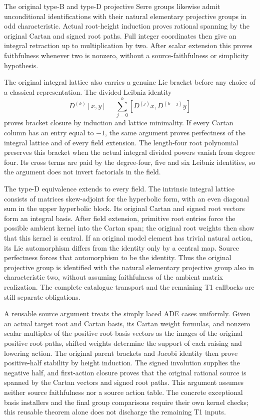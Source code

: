 The original type-B and type-D projective Serre groups likewise admit
unconditional identifications with their natural elementary projective
groups in odd characteristic. Actual root-height induction proves
rational spanning by the original Cartan and signed root paths. Full
integer coordinates then give an integral retraction up to multiplication
by two. After scalar extension this proves faithfulness whenever two is
nonzero, without a source-faithfulness or simplicity hypothesis.

The original integral lattice also carries a genuine Lie bracket before
any choice of a classical representation. The divided Leibniz identity
\[
 D^{(k)}[x,y]=\sum_{j=0}^{k}[D^{(j)}x,D^{(k-j)}y]
\]
proves bracket closure by induction and lattice minimality. If every
Cartan column has an entry equal to $-1$, the same argument proves
perfectness of the integral lattice and of every field extension.
The length-four root polynomial preserves this bracket when the actual
integral divided powers vanish from degree four. Its cross terms are
paid by the degree-four, five and six Leibniz identities, so the argument
does not invert factorials in the field.

The type-D equivalence extends to every field. The intrinsic integral
lattice consists of matrices skew-adjoint for the hyperbolic form, with an
even diagonal sum in the upper hyperbolic block. Its original Cartan and signed root vectors form an integral
basis. After field extension, primitive root entries force the possible
ambient kernel into the Cartan span; the original root weights then show
that this kernel is central. If an original model element has trivial
natural action, its Lie automorphism differs from the identity only by a
central map. Source perfectness forces that automorphism to be the
identity. Thus the original projective group is identified with the
natural elementary projective group also in characteristic two, without
assuming faithfulness of the ambient matrix realization. The complete
catalogue transport and the remaining T1 callbacks are still separate
obligations.


A reusable source argument treats the simply laced ADE cases uniformly.
Given an actual target root and Cartan basis, its Cartan weight formulas,
and nonzero scalar multiples of the positive root basis vectors as the
images of the original positive root paths, shifted weights determine the support of each raising and lowering action.
The original parent brackets and Jacobi identity then prove positive-half
stability by height induction. The signed involution supplies the negative
half, and first-action closure proves that the original rational source is
spanned by the Cartan vectors and signed root paths. This argument assumes
neither source faithfulness nor a source action table. The concrete
exceptional basis installers and the final group comparisons require their
own kernel checks; this reusable theorem alone does not discharge the
remaining T1 inputs.
